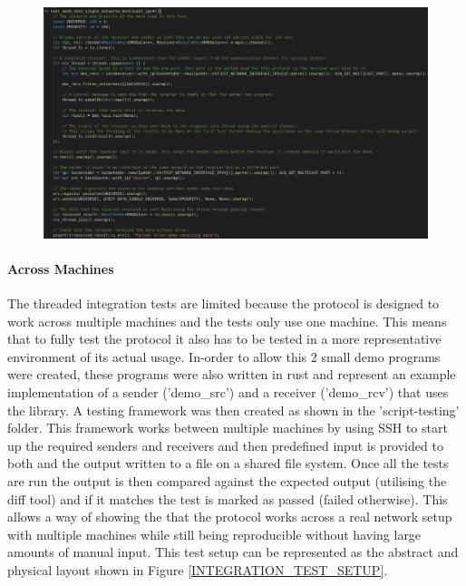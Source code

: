 \documentclass[11pt,a4paper]{article}
\begin{document}
\begin{figure}[H]
	\label{UNIT_INTEGRATION_TEST}
	\includegraphics[width=\textwidth]{integration-test-example.png}
	\caption{}
\end{figure}

\paragraph{Across Machines}
The threaded integration tests are limited because the protocol is designed to work across multiple machines and the tests only use one machine. This means that to fully test the protocol it also has to be tested in a more representative environment of its actual usage. In-order to allow this 2 small demo programs were created, these programs were also written in rust and represent an example implementation of a sender ('demo\_src') and a receiver ('demo\_rcv') that uses the library. A testing framework was then created as shown in the 'script-testing' folder. This framework works between multiple machines by using SSH to start up the required senders and receivers and then predefined input is provided to both and the output written to a file on a shared file system. Once all the tests are run the output is then compared against the expected output (utilising the diff tool) and if it matches the test is marked as passed (failed otherwise). This allows a way of showing the that the protocol works across a real network setup with multiple machines while still being reproducible without having large amounts of manual input. This test setup can be represented as the abstract and physical layout shown in Figure \ref{INTEGRATION_TEST_SETUP}.
\end{document}
